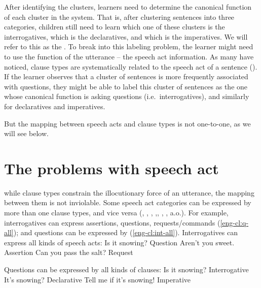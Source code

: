 After identifying the clusters, learners need to determine the canonical function of each cluster in the system. That is, after clustering sentences into three categories, children still need to learn which one of these clusters is the interrogatives, which is the declaratives, and which is the imperatives. We will refer to this as the . To break into this labeling problem, the learner might need to use the function of the utterance -- the speech act information. As many have noticed, clause types are systematically related to the speech act of a sentence (\cite{katzpostal1964, sz1985speechact}). If the learner observes that a cluster of sentences is more frequently associated with questions, they might be able to label this cluster of sentences as the one whose canonical function is asking questions (i.e.\ interrogatives), and similarly for declaratives and imperatives. 

But the mapping between speech acts and clause types is not one-to-one, as we will see below.







\section{The problems with speech act}
while clause types constrain the illocutionary force of an utterance, the mapping between them is not inviolable. Some speech act categories can be expressed by more than one clause types, and vice versa (\citealt{searle1975tax}, \citealt{searle1976class}, \citealt{bachharnish1979}, \citealt{levinson1983},\citealt{searlevanderveken1985}, \citealt{portner2018}, \citealt{starr2014}, \citealt{murraystarr2020} a.o.). For example, interrogatives can express assertions, questions, requests/commands (\ref{eng-cl:q-all}); and questions can be expressed by \diis{} (\ref{eng-cl:int-all}).
Interrogatives can express all kinds of speech acts:
\bxl Is it snowing? \hfill Question
\ex Aren't you sweet. \hfill Assertion
\ex Can you pass the salt? \hfill Request
\exl
\eex

Questions can be expressed by all kinds of clauses:
\bxl
Is it snowing? \hfill Interrogative
\ex It's snowing? \hfill Declarative
\ex Tell me if it's snowing! \hfill Imperative
\exl
\eex



